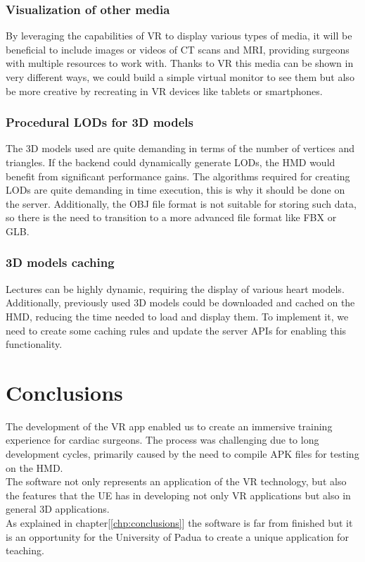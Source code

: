 \subsection{Visualization of other media}
\noindent
By leveraging the capabilities of \ac{VR} to display various types of media, it will be beneficial to include images or videos of \ac{CT} scans and \ac{MRI}, providing surgeons with multiple resources to work with.
Thanks to \ac{VR} this media can be shown in very different ways, we could build a simple virtual monitor to see them but also be more creative by recreating in \ac{VR} devices like tablets or smartphones.

\subsection{Procedural LODs for 3D models}
\noindent
The 3D models used are quite demanding in terms of the number of vertices and triangles. If the backend could dynamically generate \ac{LOD}s, the \ac{HMD} would benefit from significant performance gains.
The algorithms required for creating \ac{LOD}s are quite demanding in time execution, this is why it should be done on the server.
Additionally, the OBJ file format is not suitable for storing such data, so there is the need to transition to a more advanced file format like FBX or GLB.

\subsection{3D models caching}
\noindent
Lectures can be highly dynamic, requiring the display of various heart models. Additionally, previously used 3D models could be downloaded and cached on the \ac{HMD}, reducing the time needed to load and display them.
To implement it, we need to create some caching rules and update the server \ac{API}s for enabling this functionality.

\chapter{Conclusions}
\noindent
The development of the \ac{VR} app enabled us to create an immersive training experience for cardiac surgeons.
The process was challenging due to long development cycles, primarily caused by the need to compile \ac{APK} files for testing on the \ac{HMD}.\\
The software not only represents an application of the \ac{VR} technology, but also the features  that the \ac{UE} has in developing not only \ac{VR} applications but also in general 3D applications.\\
As explained in chapter[\ref{chp:conclusions}] the software is far from finished but it is an opportunity for the University of Padua to create a unique application for teaching.\\